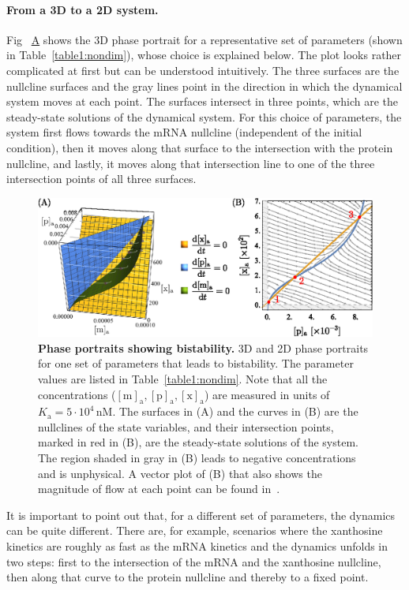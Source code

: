 \documentclass[10pt,letterpaper]{article}
\newcommand{\unit}[1]{\,\mathrm{#1}}
\newcommand{\n}[1]{\mathrm{#1}}
\newcommand\subref[2]{%
	\def\myref{\getrefnumber{#1}}%
	\hyperref[#1]{\myref\mbox{#2}}%
}
\begin{document}
	\paragraph*{From a 3D to a 2D system.} 
	Fig~\subref{fig4:bistability}{A} shows the 3D phase portrait for a
	representative set of parameters (shown in Table~\ref{table1:nondim}),
	whose choice is explained below. The plot looks rather complicated at first
	but can be understood intuitively. The three surfaces are the nullcline surfaces and
	the gray lines point in the direction in which the dynamical system moves at
	each point. The surfaces intersect in three points, which are the steady-state
	solutions of the dynamical system. For this choice of parameters, the system
	first flows towards the mRNA nullcline (independent of the initial condition),
	then it moves along that surface to
	the intersection with the protein nullcline, and lastly, it moves along that
	intersection line to one of the three intersection points of all three
	surfaces.
	
	\begin{figure}%
		\centering
		\includegraphics{media/Fig4_bistability.eps}
		\caption{{\bf Phase portraits showing bistability.}
			3D and 2D phase portraits for one set of parameters that leads to
			bistability. The parameter values are listed in
			Table~\ref{table1:nondim}. Note that all the concentrations
			($\n{[m]_a}, \n{[p]_a}, \n{[x]_a}$) are measured in units of
			$K_{\n{a}} = 5 \cdot 10^{4} \unit{nM}$. The surfaces in (A) and the
			curves in (B) are the nullclines of the state variables, and their
			intersection points, marked in red in (B), are the steady-state
			solutions of the system. The region shaded in gray in (B) leads to
			negative concentrations and is unphysical. A vector plot of (B) that
			also shows the magnitude of flow at each point can be found
			in~.}
		\label{fig4:bistability}
	\end{figure}
	
	It is important to point out that, for a different set of parameters, the
	dynamics can be quite different. There are, for example, scenarios where the
	xanthosine kinetics are roughly as fast as the mRNA kinetics and the
	dynamics unfolds in two steps: first to the intersection of the mRNA and the
	xanthosine nullcline, then along that curve to the protein nullcline and
	thereby to a fixed point.
	
\end{document}
